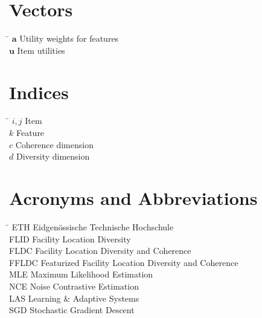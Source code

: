 \section*{Vectors}

\begin{tabbing}
  \hspace*{1.6cm} \= \kill
  $\mathbf{a}$ \> Utility weights for features \\ [0.5ex]
  $\mathbf{u}$ \> Item utilities \\ [0.5ex]
\end{tabbing}

\section*{Indices}

\begin{tabbing}
  \hspace*{1.6cm} \= \kill
  $i, j$ \> Item \\ [0.5ex]
  $k$ \> Feature \\ [0.5ex]
  $c$ \> Coherence dimension \\ [0.5ex]
  $d$ \> Diversity dimension \\ [0.5ex]
\end{tabbing}

\section*{Acronyms and Abbreviations}
\begin{tabbing}
 \hspace*{1.6cm}  \= \kill
 ETH \> Eidgenössische Technische Hochschule \\[0.5ex]
 FLID \> Facility Location Diversity \\[0.5ex]
 FLDC \> Facility Location Diversity and Coherence \\[0.5ex]
 FFLDC \> Featurized Facility Location Diversity and Coherence \\ [0.5ex]
 MLE \> Maximum Likelihood Estimation \\ [0.5ex]
 NCE \> Noise Contrastive Estimation \\ [0.5ex]
 LAS \> Learning \& Adaptive Systems \\ [0.5ex]
 SGD \> Stochastic Gradient Descent \\ [0.5ex]

\end{tabbing}